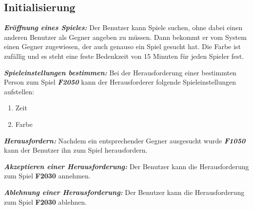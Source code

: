 \documentclass[parskip=full]{scrartcl}
\begin{document}
\subsection{Initialisierung}
\begin{description}
	\hypertarget{F2010}{\item[F2010]}\textbf{\textit{Eröffnung 	eines Spieles: }} Der Benutzer kann Spiele suchen, ohne dabei einen anderen Benutzer als Gegner angeben zu müssen. Dann bekommt er vom System einen Gegner zugewiesen, der auch genauso ein Spiel gesucht hat. Die Farbe ist zufällig und es steht eine feste \gls{Bedenkzeit} von 15 Minuten für jeden Spieler fest.
	\item[F2020] \textbf{\textit{Spieleinstellungen bestimmen: }} Bei der Herausforderung einer bestimmten Person zum Spiel \textbf{\textit{F2050}} kann der Herausforderer folgende
	Spieleinstellungen aufstellen:
	\begin{enumerate}
		\item Zeit
		\item Farbe
	\end{enumerate}
	\item[F2030] \textbf{\textit{Herausfordern: }} Nachdem ein entsprechender Gegner ausgesucht wurde \textbf{\textit{F1050}} kann der Benutzer ihn zum Spiel herausfordern.
	\item [F2040] \textbf{\textit{Akzeptieren einer Herausforderung: }} Der Benutzer kann die Herausforderung zum Spiel \textbf{F2030} annehmen.
	\item [F2050] \textbf{\textit{Ablehnung einer Herausforderung: }} Der Benutzer kann die Herausforderung zum Spiel \textbf{F2030} ablehnen.
	
	
	
	
\end{description}
\end{document}
